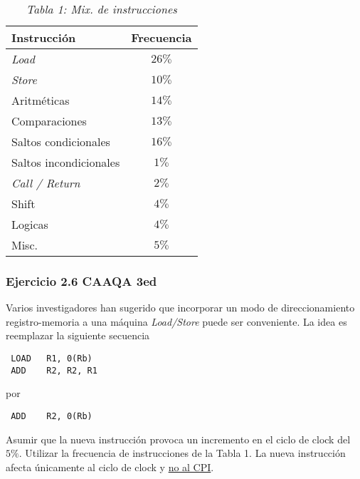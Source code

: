 \documentclass{beamer}
\begin{document}
 \begin{frame}

         \begin{center}
         \begin{table}
         \begin{tabular}{||l|c||}
         \hline
         Instrucción & Frecuencia \\\hline
         \textit{Load} & $26\%$ \\\hline
         \textit{Store} & $10\%$ \\\hline
         Aritméticas & $14\%$ \\\hline
         Comparaciones & $13\%$ \\\hline
         Saltos condicionales & $16\%$ \\\hline
         Saltos incondicionales & $1\%$ \\\hline
         \textit{Call / Return} & $2\%$ \\\hline
         Shift & $4\%$ \\\hline
         Logicas & $4\%$ \\\hline
         Misc. & $5\%$ \\\hline

         \end{tabular}
                           \caption*{\textit{Tabla 1: Mix. de instrucciones}} \label{tab:tabla1} %
\end{table}
         \end{center}

\end{frame}

 \begin{frame}[fragile]
 \frametitle{Ejercicio 2.6 CAAQA 3ed}
Varios investigadores han sugerido que incorporar un modo de direccionamiento registro-memoria a una máquina \textit{Load/Store} puede ser conveniente. La idea es reemplazar la siguiente secuencia
 
\begin{lstlisting}
 LOAD   R1, 0(Rb)
 ADD    R2, R2, R1
\end{lstlisting}

por

\begin{lstlisting}
 ADD    R2, 0(Rb)
\end{lstlisting}


Asumir que la nueva instrucción provoca un incremento en el ciclo de clock del $5\%$. Utilizar la frecuencia de instrucciones de la Tabla 1. La nueva instrucción afecta únicamente al ciclo de clock y \underline{no al CPI}.

\end{frame}
\end{document}
